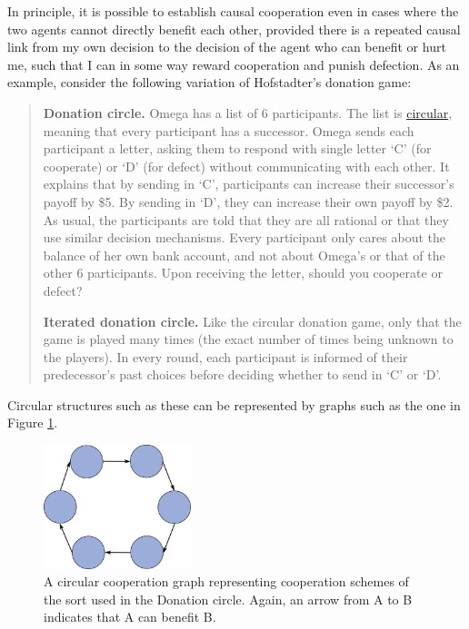 In principle, it is possible to establish causal cooperation even in
cases where the two agents cannot directly benefit each other, provided
there is a repeated causal link from my own decision to the decision of
the agent who can benefit or hurt me, such that I can in some way reward
cooperation and punish defection. As an example, consider the following
variation of Hofstadter's donation game:

\begin{quote}
\textbf{Donation circle.} Omega has a list of 6 participants. The list
is
\href{https://en.wikipedia.org/wiki/Linked_list\#Circular_Linked_list}{circular},
meaning that every participant has a successor. Omega sends each
participant a letter, asking them to respond with single letter `C' (for
cooperate) or `D' (for defect) without communicating with each other. It
explains that by sending in `C', participants can increase their
successor's payoff by \$5. By sending in `D', they can increase their
own payoff by \$2. As usual, the participants are told that they are all
rational or that they use similar decision mechanisms. Every participant
only cares about the balance of her own bank account, and not about
Omega's or that of the other 6 participants. Upon receiving the letter,
should you cooperate or defect?

\textbf{Iterated donation circle.} Like the circular donation game, only
that the game is played many times (the exact number of times being
unknown to the players). In every round, each participant is informed of
their predecessor's past choices before deciding whether to send in `C'
or `D'.
\end{quote}

Circular structures such as these can be represented by graphs such as
the one in Figure \ref{circular-cooperation-graph}.

\begin{figure}[h!]
    \centering
    \includegraphics[width=1.68409in]{figs/circular-cooperation-graph}
    \caption{A circular cooperation graph
representing cooperation schemes of the sort used in the Donation
circle. Again, an arrow from A to B indicates that A can benefit B.}
    \label{circular-cooperation-graph}
\end{figure}

